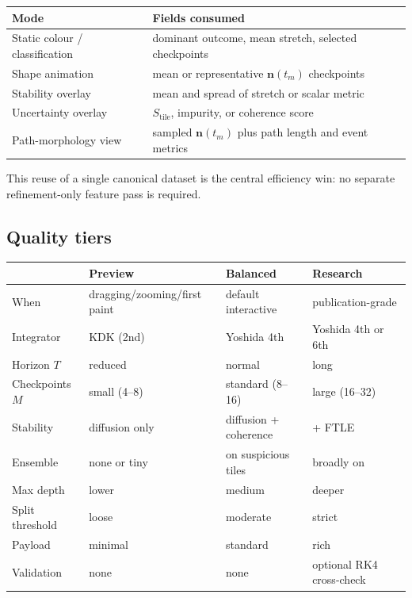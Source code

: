 \documentclass[11pt]{report}
\begin{document}
\begin{center}
\begin{tabular}{ll}
\toprule
Mode & Fields consumed \\
\midrule
Static colour / classification & dominant outcome, mean stretch, selected checkpoints \\
Shape animation & mean or representative $\mathbf n(t_m)$ checkpoints \\
Stability overlay & mean and spread of stretch or scalar metric \\
Uncertainty overlay & $S_{\text{tile}}$, impurity, or coherence score \\
Path-morphology view & sampled $\mathbf n(t_m)$ plus path length and event metrics \\
\bottomrule
\end{tabular}
\end{center}

This reuse of a single canonical dataset is the central efficiency win: no separate refinement-only feature pass is required.

\subsection{Quality tiers}
\label{sec:quality_tiers}

\begin{center}
\begin{tabular}{llll}
\toprule
& Preview & Balanced & Research \\
\midrule
When & dragging/zooming/first paint & default interactive & publication-grade \\
Integrator & KDK (2nd) & Yoshida 4th & Yoshida 4th or 6th \\
Horizon $T$ & reduced & normal & long \\
Checkpoints $M$ & small (4--8) & standard (8--16) & large (16--32) \\
Stability & diffusion only & diffusion + coherence & + FTLE \\
Ensemble & none or tiny & on suspicious tiles & broadly on \\
Max depth & lower & medium & deeper \\
Split threshold & loose & moderate & strict \\
Payload & minimal & standard & rich \\
Validation & none & none & optional RK4 cross-check \\
\bottomrule
\end{tabular}
\end{center}
\end{document}

